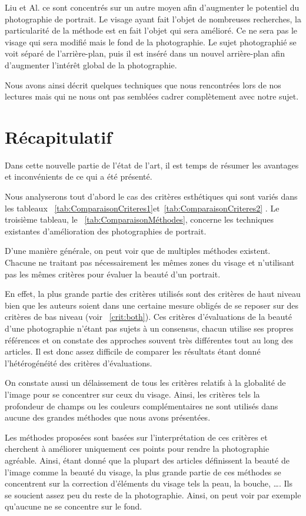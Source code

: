 \documentclass[11pt, french,screen]{report-rd-info}
\begin{document}
Liu et Al. \cite{Liu2007} ce sont concentrés sur un autre moyen afin d’augmenter le potentiel du photographie de portrait. Le visage ayant fait l’objet de nombreuses recherches, la particularité de la méthode est en fait l’objet qui sera amélioré. Ce ne sera pas le visage qui sera modifié mais le fond de la photographie. Le sujet photographié se voit séparé de l’arrière-plan, puis il est inséré dans un nouvel arrière-plan afin d’augmenter l’intérêt global de la photographie.

Nous avons ainsi décrit quelques techniques que nous rencontrées lors de nos lectures mais qui ne nous ont pas semblées cadrer complètement avec notre sujet.
\section{Récapitulatif}
Dans cette nouvelle partie de l'état de l'art, il est temps de résumer les avantages et inconvénients de ce qui a été présenté.

Nous analyserons tout d'abord le cas des critères esthétiques
qui sont variés dans les tableaux ~\ref{tab:ComparaisonCriteres1}et~\ref{tab:ComparaisonCriteres2} . Le troisième tableau, le ~\ref{tab:ComparaisonMéthodes},
concerne les techniques existantes d'amélioration des photographies de portrait.

D’une manière générale, on peut voir que de multiples méthodes existent. Chacune ne traitant pas nécessairement les mêmes zones du visage et n’utilisant pas les mêmes critères pour évaluer la beauté d’un portrait.

En effet, la plus grande partie des critères utilisés sont des critères de haut niveau bien que les auteurs soient dans une certaine mesure obligés de se reposer sur des critères de bas niveau (voir ~\ref{crit:both}). Ces critères d’évaluations de la beauté d’une photographie n’étant pas sujets à un consensus, chacun utilise ses propres références et on constate des approches souvent très différentes tout au long des articles. Il est donc assez difficile de comparer les résultats étant donné l’hétérogénéité des critères d’évaluations.

On constate aussi un délaissement de tous les critères relatifs à la globalité de l’image pour se concentrer sur ceux du visage. Ainsi, les critères tels la profondeur de champs ou les couleurs complémentaires ne sont utilisés dans aucune des grandes méthodes que nous avons présentées.

Les méthodes proposées sont basées sur l’interprétation de ces critères et cherchent à améliorer uniquement ces points pour rendre la photographie agréable. Ainsi, étant donné que la plupart des articles définissent la beauté de l’image comme la beauté du visage, la plus grande partie de ces méthodes se concentrent sur la correction d’éléments du visage tels la peau, la bouche, \ldots. Ils se soucient assez peu du reste de la photographie. Ainsi, on peut voir par exemple qu’aucune ne se concentre sur le fond.
\end{document}

